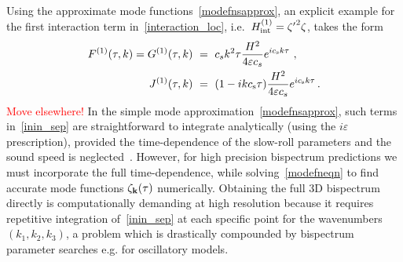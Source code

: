 Using the approximate mode functions~\eqref{modefnsapprox}, an explicit example for the first interaction term in~\eqref{interaction_loc}, i.e.\ $H_{\rm int}^{(1)} = {\zeta'}^2\zeta$, takes the form
\begin{align}\label{inin_example_FG}
    F^{(1)}(\tau,k) = G^{(1)}(\tau,k)  ~&=~  c_s k^2 \tau\frac{H^2}{4\varepsilon c_s} e^{ic_{\rm s} k\tau}~,\\
    J^{(1)}(\tau,k) ~&=~ (1-ik c_{\rm s}\tau)\frac{H^2}{4\varepsilon c_s}e^{ic_{\rm s} k\tau} \,.
\end{align}
\textcolor{red}{Move elsewhere!}
In the simple mode approximation~\eqref{modefnsapprox}, such terms in~\eqref{inin_sep} are straightforward to integrate analytically (using the $i\varepsilon$ prescription), provided the time-dependence of the slow-roll parameters and the sound speed is neglected~\cite{Maldacena}.   However, for high precision bispectrum predictions we must incorporate the full time-dependence, while solving~\eqref{modefneqn} to find accurate mode functions $\zeta_{\bf k}(\tau)$ numerically.  Obtaining the full 3D bispectrum directly is computationally demanding at high resolution because it requires repetitive integration of~\eqref{inin_sep} at each specific point for the wavenumbers $(k_1, k_2, k_3)$, a problem which is drastically compounded by bispectrum parameter searches e.g. for oscillatory models. 

